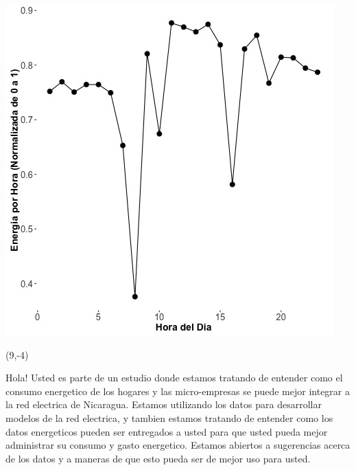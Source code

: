 \documentclass{article}\usepackage[]{graphicx}\usepackage[]{color}
\newenvironment{knitrout}{}{} %
\begin{document}
\begin{knitrout}
\color{fgcolor}
\includegraphics[scale=0.75]{figure/A3_fplot_norm_median} 
\end{knitrout}

 \begin{textblock}{1}(9,-4)
\begin{minipage}{20em}
\begingroup

\endgroup
\end{minipage}
\end{textblock}



\vspace{70px}
\begin{knitrout}
Hola! Usted es parte de un estudio donde estamos tratando de entender como el consumo energetico de los hogares y las micro-empresas se puede mejor integrar a la red electrica de Nicaragua. Estamos utilizando los datos para desarrollar modelos de la red electrica, y tambien estamos tratando de entender como los datos energeticos pueden ser entregados a usted para que usted pueda mejor administrar su consumo y gasto energetico.  Estamos abiertos a sugerencias acerca de los datos y a maneras de que esto pueda ser de mejor uso para usted.
\end{knitrout}
\end{document}
